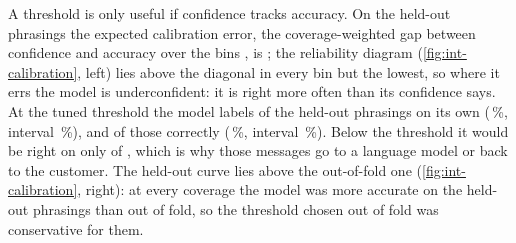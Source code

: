 A threshold is only useful if confidence tracks accuracy. On the held-out phrasings the expected calibration error,
the coverage-weighted gap between confidence and accuracy over the bins \parencite{naeini2015,guo2017}, is
; the reliability diagram (\cref{fig:int-calibration}, left) lies above the diagonal in every
bin but the lowest, so where it errs the model is underconfident: it is right more often than its confidence says. At the tuned threshold the model labels
 of the  held-out phrasings on its own (\,\%, interval
\,\%), and  of those correctly (\,\%,
interval \,\%). Below the threshold it would be right on only
 of , which is why those messages go to a language model or back to
the customer. The held-out curve lies above the out-of-fold one (\cref{fig:int-calibration}, right): at every coverage the
model was more accurate on the held-out phrasings than out of fold, so the threshold chosen out of fold was
conservative for them.
